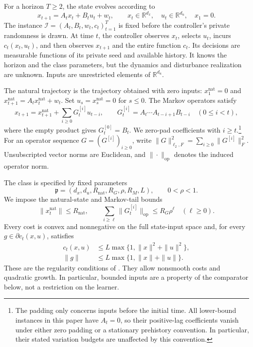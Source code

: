 \documentclass[11pt]{article}
\theoremstyle{remark}
\newcommand{\R}{\mathbb R}
\newcommand{\op}{\mathrm{op}}
\newcommand{\nat}{\mathrm{nat}}
\begin{document}
For a horizon $T\ge2$, the state evolves according to
\begin{equation}\label{eq:dynamics}
 x_{t+1}=A_tx_t+B_tu_t+w_t,
 \qquad x_t\in\R^{d_x},\quad u_t\in\R^{d_u},\quad x_1=0.
\end{equation}
The instance $\mathcal I=(A_t,B_t,w_t,c_t)_{t=1}^T$ is fixed before
the controller's private randomness is drawn. At time $t$, the controller
observes $x_t$, selects $u_t$, incurs $c_t(x_t,u_t)$, and then observes
$x_{t+1}$ and the entire function $c_t$. Its decisions are measurable
functions of its private seed and available history. It knows the horizon
and the class parameters, but the dynamics and disturbance realization
are unknown. Inputs are unrestricted elements of $\R^{d_u}$.

The natural trajectory is the trajectory obtained with zero inputs:
$x_1^{\nat}=0$ and $x_{t+1}^{\nat}=A_tx_t^{\nat}+w_t$.
Set $u_s=x_s^{\nat}=0$ for $s\le0$. The Markov operators satisfy
\begin{equation}\label{eq:markov}
 x_{t+1}=x_{t+1}^{\nat}+\sum_{i\ge0}G_t^{[i]}u_{t-i},
 \qquad
 G_t^{[i]}=A_t\cdots A_{t-i+1}B_{t-i}\quad(0\le i<t),
\end{equation}
where the empty product gives $G_t^{[0]}=B_t$.
We zero-pad coefficients with $i\ge t$.\footnote{The padding only
concerns inputs before the initial time. All lower-bound instances in this
paper have $A_t=0$, so their positive-lag coefficients vanish under either
zero padding or a stationary prehistory convention. In particular, their
stated variation budgets are unaffected by this convention.}
For an operator sequence $G=(G^{[i]})_{i\ge0}$, write
$\|G\|_{\ell_2,F}^2=\sum_{i\ge0}\|G^{[i]}\|_F^2$.
Unsubscripted vector norms are Euclidean, and $\|\cdot\|_{\op}$
denotes the induced operator norm.

The class is specified by fixed parameters
\[
 \mathfrak p=(d_x,d_u,R_{\nat},R_G,\rho,R_M,L),\qquad 0<\rho<1.
\]
We impose the natural-state and Markov-tail bounds
\begin{equation}\label{eq:regularity}
 \|x_t^{\nat}\|\le R_{\nat},\qquad
 \sum_{i\ge\ell}\|G_t^{[i]}\|_{\op}\le R_G\rho^\ell
 \quad(\ell\ge0).
\end{equation}
Every cost is convex and nonnegative on the full state-input space and,
for every $g\in\partial c_t(x,u)$, satisfies
\begin{align}
 c_t(x,u)&\le L\max\{1,\|x\|^2+\|u\|^2\},\label{eq:growth}\\
 \|g\|&\le L\max\{1,\|x\|+\|u\|\}.\label{eq:gradgrowth}
\end{align}
These are the regularity conditions of \citet[Assumptions~1--3]{minasyan}.
They allow nonsmooth costs and quadratic growth. In particular, bounded
inputs are a property of the comparator below, not a restriction on the learner.
\end{document}
